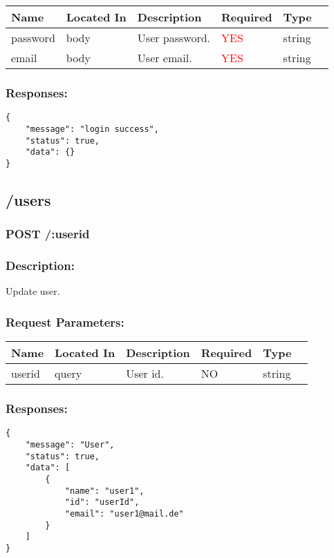 \documentclass{article}
\begin{document}
\begin{tabular}{ | l | l | l | l | l | p{5cm} |} 
 \hline 
\textbf{Name} & \textbf{Located In} & \textbf{Description} & \textbf{Required} & \textbf{Type}\\ \hline 
password & body & User password. & \textcolor{red}{YES} & string\\ \hline 
email & body & User email. & \textcolor{red}{YES} & string\\ \hline 
\end{tabular} 
 
\subsubsection{Responses:}
  
\begin{lstlisting}[frame=single, title=\textbf{200}] 
{
    "message": "login success",
    "status": true,
    "data": {}
}
\end{lstlisting}
  
\subsection*{/users}
\subsubsection*{\textcolor{NavyBlue}{POST} /:userid}
\subsubsection{Description:} 
Update user.
 \subsubsection{Request Parameters:} 
 
\begin{tabular}{ | l | l | l | l | l | p{5cm} |} 
 \hline 
\textbf{Name} & \textbf{Located In} & \textbf{Description} & \textbf{Required} & \textbf{Type}\\ \hline 
userid & query & User id. & NO & string\\ \hline 
\end{tabular} 
 
\subsubsection{Responses:}
  
\begin{lstlisting}[frame=single, title=\textbf{200}] 
{
    "message": "User",
    "status": true,
    "data": [
        {
            "name": "user1",
            "id": "userId",
            "email": "user1@mail.de"
        }
    ]
}
\end{lstlisting}
  
\end{document}
